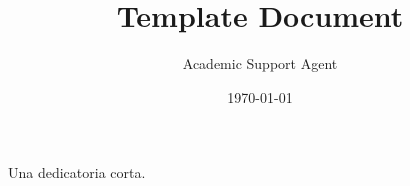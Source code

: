\documentclass{article}
\title{Template Document}
\author{Academic Support Agent}
\date{\today}
\begin{document}
\maketitle

\maketitle

\begin{resumen}
\lipsum[1-4]
\end{resumen}


\begin{dedicatoria}
Una dedicatoria corta.
\end{dedicatoria}

\begin{thanks}
\lipsum[1-2]
\end{thanks}
{
\hypersetup{linkcolor=black}



}

\pagestyle{fancy}
\fancyhead{} %
\fancyhead[C]{\nouppercase{\rightmark\hfill\leftmark}}
\fancyhead[C]{\nouppercase{\leftmark\hfill\rightmark}}
\fancyfoot{} %
\fancyfoot[C]{\thepage}

















\begin{appendices}

\end{appendices}
\end{document}
